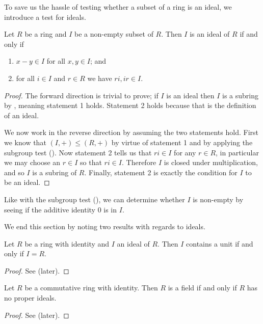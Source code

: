 To save us the hassle of testing whether a subset of a ring is an ideal, we introduce a test for ideals.
\begin{theorem}\label{thrm-test-for-ideal}
    Let $R$ be a ring and $I$ be a non-empty subset of $R$. Then $I$ is an ideal of $R$ if and only if
    \begin{enumerate}
        \item $x - y \in I$ for all $x, y \in I$; and
        \item for all $i \in I$ and $r \in R$ we have $ri, ir \in I$.
    \end{enumerate}
\end{theorem}
\begin{proof}
    The forward direction is trivial to prove; if $I$ is an ideal then $I$ is a subring by , meaning statement 1 holds. Statement 2 holds because that is the definition of an ideal.

    We now work in the reverse direction by assuming the two statements hold. First we know that $(I,+) \leq (R,+)$ by virtue of statement 1 and by applying the subgroup test (). Now statement 2 tells us that $ri \in I$ for any $r \in R$, in particular we may choose an $r \in I$ so that $ri \in I$. Therefore $I$ is closed under multiplication, and so $I$ is a subring of $R$. Finally, statement 2 is exactly the condition for $I$ to be an ideal.
\end{proof}
\begin{remark}
    Like with the subgroup test (), we can determine whether $I$ is non-empty by seeing if the additive identity 0 is in $I$.
\end{remark}

We end this section by noting two results with regards to ideals.

\begin{proposition}\label{prop-ideal-contains-unit-iff-ideal-is-whole-ring}
    Let $R$ be a ring with identity and $I$ an ideal of $R$. Then $I$ contains a unit if and only if $I = R$.
\end{proposition}
\begin{proof}
    See  (later).
\end{proof}

\begin{proposition}\label{prop-ring-is-field-iff-no-proper-ideals}
    Let $R$ be a commutative ring with identity. Then $R$ is a field if and only if $R$ has no proper ideals.
\end{proposition}
\begin{proof}
    See  (later).
\end{proof}

